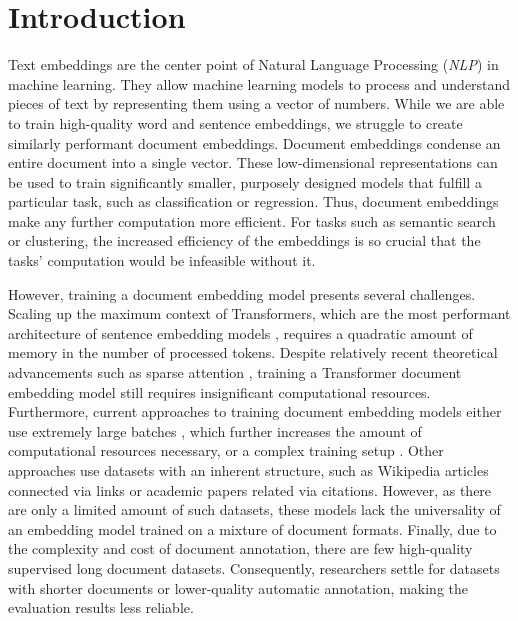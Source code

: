 \chapter*{Introduction}

Text embeddings are the center point of Natural Language Processing
(\emph{NLP}) in machine learning. They allow machine learning models to process
and understand pieces of text by representing them using a vector of numbers.
While we are able to train high-quality word and sentence embeddings, we
struggle to create similarly performant document embeddings. Document
embeddings condense an entire document into a single vector. These
low-dimensional representations can be used to train significantly smaller,
purposely designed models that fulfill a particular task, such as
classification or regression. Thus, document embeddings make any further
computation more efficient. For tasks such as semantic search or clustering,
the increased efficiency of the embeddings is so crucial that the tasks'
computation would be infeasible without it.

However, training a document embedding model presents several challenges.
Scaling up the maximum context of Transformers, which are the most performant
architecture of sentence embedding models
\citep{reimers2019sentence,gao2021simcse}, requires a quadratic amount of
memory in the number of processed tokens. Despite relatively recent theoretical
advancements such as sparse attention \citep{child2019generating}, training a
Transformer document embedding model still requires insignificant computational
resources. Furthermore, current approaches to training document embedding
models either use extremely large batches \citep{neelakantan2022text}, which
further increases the amount of computational resources necessary, or a complex
training setup \citep{izacard2021unsupervised}. Other approaches
\citep{ostendorff2022neighborhood, cohan2020specter} use datasets with an
inherent structure, such as Wikipedia articles connected via links or academic
papers related via citations. However, as there are only a limited amount of
such datasets, these models lack the universality of an embedding model trained
on a mixture of document formats. Finally, due to the complexity and cost of
document annotation, there are few high-quality supervised long document
datasets. Consequently, researchers settle for datasets with shorter documents
or lower-quality automatic annotation, making the evaluation results less
reliable.

